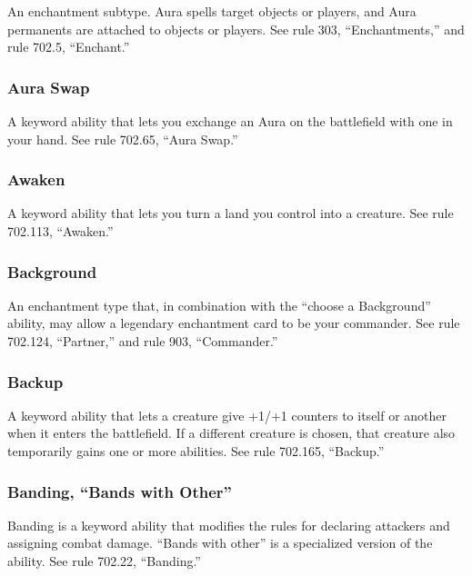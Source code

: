 {An enchantment subtype. Aura spells target objects or players, and Aura permanents are attached to objects or players. See rule 303, “Enchantments,” and rule 702.5, “Enchant.”

\subsubsection*{Aura Swap}

A keyword ability that lets you exchange an Aura on the battlefield with one in your hand. See rule 702.65, “Aura Swap.”

\subsubsection*{Awaken}

A keyword ability that lets you turn a land you control into a creature. See rule 702.113, “Awaken.”

\subsubsection*{Background}

An enchantment type that, in combination with the “choose a Background” ability, may allow a legendary enchantment card to be your commander. See rule 702.124, “Partner,” and rule 903, “Commander.”

\subsubsection*{Backup}

A keyword ability that lets a creature give +1/+1 counters to itself or another when it enters the battlefield. If a different creature is chosen, that creature also temporarily gains one or more abilities. See rule 702.165, “Backup.”

\subsubsection*{Banding, “Bands with Other”}

Banding is a keyword ability that modifies the rules for declaring attackers and assigning combat damage. “Bands with other” is a specialized version of the ability. See rule 702.22, “Banding.”

}
